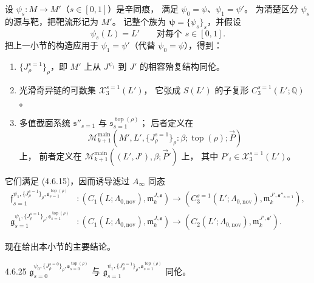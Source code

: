 设 $\psi_s\colon M\to M'$（$s\in[0,1]$）是辛同痕，
满足 $\psi_0=\psi$、$\psi_1=\psi'$。
为清楚区分 $\psi_s$ 的源与靶，把靶流形记为 $M'$。
记整个族为 $\boldsymbol\psi=\{\psi_s\}_s$，并假设
\begin{equation}
\psi_s(L)=L'\qquad\text{对每个 }s\in[0,1].
\tag{4.6.23}\label{eq:4-6-23}
\end{equation}
把上一小节的构造应用于 $\psi_1=\psi'$（代替
$\psi_0=\psi$），得到：
\begin{enumerate}[label=\textup{(4.6.24.\arabic*)},leftmargin=5.9em]
 \item
 $\{J_\rho^{s=1}\}_\rho$，即 $M'$ 上从
 $J^{\psi_1}$ 到 $J'$ 的相容殆复结构同伦。
 \item
 光滑奇异链的可数集 $\mathcal X_3^{s=1}(L')$，
 它张成 $S(L')$ 的子复形 $C_3^{s=1}(L';\mathbb Q)$。
 \item
 多值截面系统
 $\mathfrak s''_{s=1}$ 与
 $\mathfrak s^{\operatorname{top}(\rho)}_{s=1}$；
 后者定义在
 \[
 \mathcal M_{k+1}^{\mathrm{main}}
 (M',L',\{J_\rho^{s=1}\}_\rho:
 \beta;\operatorname{top}(\rho);\vec P)
 \]
 上，
 前者定义在
 $\mathcal M_{k+1}^{\mathrm{main}}
 ((L',J'),\beta;\vec P')$ 上，
 其中 $P'_i\in\mathcal X_3^{s=1}(L')$。
\end{enumerate}
它们满足 (4.6.15)，因而诱导滤过 $A_\infty$ 同态
\[
\begin{aligned}
\mathfrak f_{s=1}^{\psi_1,\{J_\rho^{s=1}\}_\rho,
\mathfrak s^{\operatorname{top}(\rho)}_{s=1}}
&\colon(C_1(L;\Lambda_{0,\mathrm{nov}}),
\mathfrak m_k^{J,\mathfrak s})
\longrightarrow
(C_3^{s=1}(L';\Lambda_{0,\mathrm{nov}}),
\mathfrak m_k^{J',\mathfrak s''_{s=1}}),\\
\mathfrak g_{s=1}^{\psi_1,\{J_\rho^{s=1}\}_\rho,
\mathfrak s^{\operatorname{top}(\rho)}_{s=1}}
&\colon(C_1(L;\Lambda_{0,\mathrm{nov}}),
\mathfrak m_k^{J,\mathfrak s})
\longrightarrow
(C_2(L';\Lambda_{0,\mathrm{nov}}),
\mathfrak m_k^{J',\mathfrak s'}).
\end{aligned}
\]

现在给出本小节的主要结论。
\begin{theorem}{4.6.25}\label{thm:4-6-25}
$\mathfrak g_{s=0}^{\psi_0,\{J_\rho^{s=0}\}_\rho,
\mathfrak s^{\operatorname{top}(\rho)}_{s=0}}$
与
$\mathfrak g_{s=1}^{\psi_1,\{J_\rho^{s=1}\}_\rho,
\mathfrak s^{\operatorname{top}(\rho)}_{s=1}}$
同伦。
\end{theorem}


